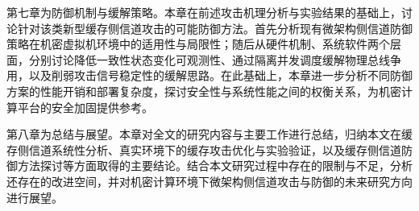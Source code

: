 第七章为防御机制与缓解策略。本章在前述攻击机理分析与实验结果的基础上，讨论针对该类新型缓存侧信道攻击的可能防御方法。首先分析现有微架构侧信道防御策略在机密虚拟机环境中的适用性与局限性；随后从硬件机制、系统软件两个层面，分别讨论降低一致性状态变化可观测性、通过隔离并发调度缓解物理总线争用，以及削弱攻击信号稳定性的缓解思路。在此基础上，本章进一步分析不同防御方案的性能开销和部署复杂度，探讨安全性与系统性能之间的权衡关系，为机密计算平台的安全加固提供参考。

第八章为总结与展望。本章对全文的研究内容与主要工作进行总结，归纳本文在缓存侧信道系统性分析、真实环境下的缓存攻击优化与实验验证，以及缓存侧信道防御方法探讨等方面取得的主要结论。结合本文研究过程中存在的限制与不足，分析还存在的改进空间，并对机密计算环境下微架构侧信道攻击与防御的未来研究方向进行展望。
